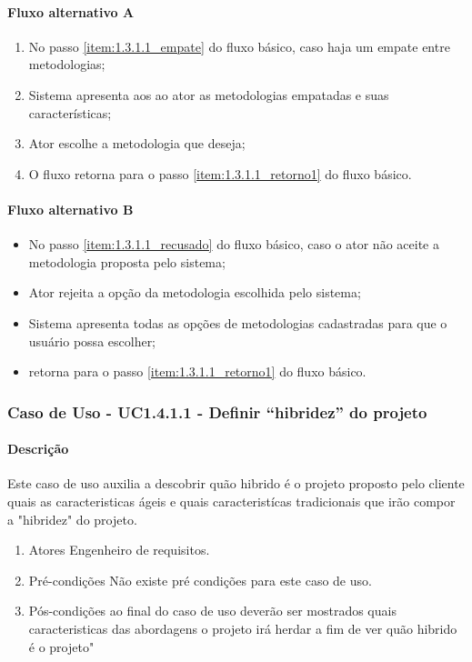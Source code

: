 \paragraph{Fluxo alternativo A}

	\begin{enumerate}
		\item No passo \ref{item:1.3.1.1_empate} do fluxo básico, caso haja um empate entre metodologias;
		\item Sistema apresenta aos ao ator as metodologias empatadas e suas características;
		\item Ator escolhe a metodologia que deseja;
		\item O fluxo retorna para o passo \ref{item:1.3.1.1_retorno1} do fluxo básico.
	\end{enumerate}

\paragraph{Fluxo alternativo B}

	\begin{itemize}
		\item No passo \ref{item:1.3.1.1_recusado} do fluxo básico, caso o ator não aceite a metodologia proposta pelo sistema;
		\item Ator rejeita a opção da metodologia escolhida pelo sistema;
		\item Sistema apresenta todas as opções de metodologias cadastradas para que o usuário possa escolher;
		\item retorna para o passo \ref{item:1.3.1.1_retorno1} do fluxo básico.
	\end{itemize}	
	
\subsubsection{Caso de Uso - UC1.4.1.1 - Definir ``hibridez'' do projeto}
\paragraph{Descrição}
Este caso de uso auxilia a descobrir quão hibrido é o projeto proposto pelo cliente quais as caracteristicas ágeis e quais caracteristícas tradicionais que irão compor a "hibridez" do projeto.

\begin{enumerate}
	\item Atores
		Engenheiro de requisitos. 
	\item Pré-condições
		Não existe pré condições para este caso de uso.
	\item Pós-condições
		ao final do caso de uso deverão ser mostrados quais caracteristicas das abordagens o projeto irá herdar a fim de ver quão hibrido é o projeto" 
\end{enumerate}
